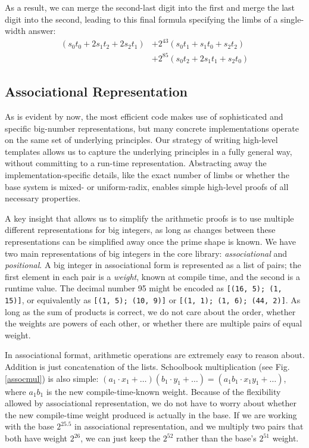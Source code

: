 \documentclass[conference,letterpaper]{IEEEtran}
\begin{document}
As a result, we can merge the second-last digit into the first and merge the last digit into the second, leading to this final formula specifying the limbs of a single-width answer:
\begin{align*}
  (s_0t_0 + 2s_1t_2 + 2s_2t_1) &+ 2^{43}(s_0t_1 + s_1t_0 + s_2t_2) \\
  &+ 2^{85}(s_0t_2 + 2s_1t_1 + s_2t_0)
\end{align*}

\subsection{Associational Representation}

As is evident by now, the most efficient code makes use of sophisticated and specific big-number representations, but many concrete implementations operate on the same set of underlying principles.
Our strategy of writing high-level templates allows us to capture the underlying principles in a fully general way, without committing to a run-time representation.
Abstracting away the implementation-specific details, like the exact number of limbs or whether the base system is mixed- or uniform-radix, enables simple high-level proofs of all necessary properties.

A key insight that allows us to simplify the arithmetic proofs is to use multiple different representations for big integers, as long as changes between these representations can be simplified away once the prime shape is known.
We have two main representations of big integers in the core library: \emph{associational} and \emph{positional}.
A big integer in associational form is represented as a list of pairs; the first element in each pair is a \emph{weight}, known at compile time, and the second is a runtime value.
The decimal number 95 might be encoded as \texttt{[(16, 5); (1, 15)]}, or equivalently as \texttt{[(1, 5); (10, 9)]} or \texttt{[(1, 1); (1, 6); (44, 2)]}.
As long as the sum of products is correct, we do not care about the order, whether the weights are powers of each other, or whether there are multiple pairs of equal weight.

In associational format, arithmetic operations are extremely easy to reason about.
Addition is just concatenation of the lists.
Schoolbook multiplication (see Fig. \ref{assocmul}) is also simple: $(a_1\cdot x_1 + \ldots)(b_1\cdot y_1 + \ldots) = (a_1b_1\cdot x_1y_1 + \ldots)$, where $a_1b_1$ is the new compile-time-known weight.
Because of the flexibility allowed by associational representation, we do not have to worry about whether the new compile-time weight produced is actually in the base.
If we are working with the base $2^{25.5}$ in associational representation, and we multiply two pairs that both have weight $2^{26}$, we can just keep the $2^{52}$ rather than the base's $2^{51}$ weight.
\end{document}
